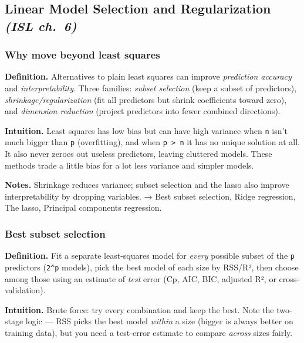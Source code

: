 \documentclass[
  10pt,
  letterpaper,
  onecolumn]{article}
\begin{document}
\hypertarget{linear-model-selection-and-regularization-isl-ch.-6}{%
\subsection{\texorpdfstring{Linear Model Selection and Regularization
\emph{(ISL
ch.~6)}}{Linear Model Selection and Regularization (ISL ch.~6)}}\label{linear-model-selection-and-regularization-isl-ch.-6}}

\hypertarget{why-move-beyond-least-squares}{%
\subsubsection{Why move beyond least
squares}\label{why-move-beyond-least-squares}}

\textbf{Definition.} Alternatives to plain least squares can improve
\emph{prediction accuracy} and \emph{interpretability}. Three families:
\emph{subset selection} (keep a subset of predictors),
\emph{shrinkage/regularization} (fit all predictors but shrink
coefficients toward zero), and \emph{dimension reduction} (project
predictors into fewer combined directions).

\textbf{Intuition.} Least squares has low bias but can have high
variance when \texttt{n} isn't much bigger than \texttt{p}
(overfitting), and when \texttt{p\ \textgreater{}\ n} it has no unique
solution at all. It also never zeroes out useless predictors, leaving
cluttered models. These methods trade a little bias for a lot less
variance and simpler models.

\textbf{Notes.} Shrinkage reduces variance; subset selection and the
lasso also improve interpretability by dropping variables. → Best subset
selection, Ridge regression, The lasso, Principal components regression.

\hypertarget{best-subset-selection}{%
\subsubsection{Best subset selection}\label{best-subset-selection}}

\textbf{Definition.} Fit a separate least-squares model for \emph{every}
possible subset of the \texttt{p} predictors (\texttt{2\^{}p} models),
pick the best model of each size by RSS/R², then choose among those
using an estimate of \emph{test} error (Cp, AIC, BIC, adjusted R², or
cross-validation).

\textbf{Intuition.} Brute force: try every combination and keep the
best. Note the two-stage logic --- RSS picks the best model
\emph{within} a size (bigger is always better on training data), but you
need a test-error estimate to compare \emph{across} sizes fairly.
\end{document}
